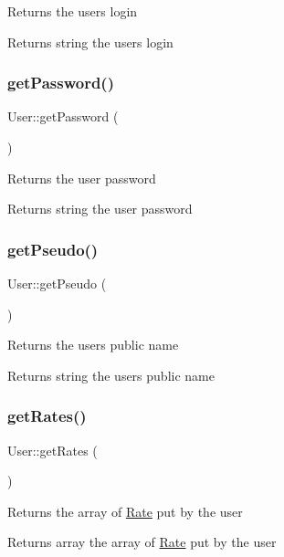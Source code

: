 Returns the user\textquotesingle{}s login \begin{DoxyReturn}{Returns}
string the user\textquotesingle{}s login 
\end{DoxyReturn}
\mbox{\label{classUser_a3e71eeea3e373e90dc902cc2f318ad3d}} 
\subsubsection{\texorpdfstring{get\+Password()}{getPassword()}}
{\footnotesize\ttfamily User\+::get\+Password (\begin{DoxyParamCaption}{ }\end{DoxyParamCaption})}

Returns the user password \begin{DoxyReturn}{Returns}
string the user password 
\end{DoxyReturn}
\mbox{\label{classUser_a9c2b57df71464b850d47e472cd462ff8}} 
\subsubsection{\texorpdfstring{get\+Pseudo()}{getPseudo()}}
{\footnotesize\ttfamily User\+::get\+Pseudo (\begin{DoxyParamCaption}{ }\end{DoxyParamCaption})}

Returns the user\textquotesingle{}s public name \begin{DoxyReturn}{Returns}
string the user\textquotesingle{}s public name 
\end{DoxyReturn}
\mbox{\label{classUser_a03c6f88dd5a3186227e0d89d2fe7dcc2}} 
\subsubsection{\texorpdfstring{get\+Rates()}{getRates()}}
{\footnotesize\ttfamily User\+::get\+Rates (\begin{DoxyParamCaption}{ }\end{DoxyParamCaption})}

Returns the array of \hyperlink{classRate}{Rate} put by the user \begin{DoxyReturn}{Returns}
array the array of \hyperlink{classRate}{Rate} put by the user 
\end{DoxyReturn}
\mbox{\label{classUser_a3fdd56ceb1e13d15b8275e0768b70a1d}} 
